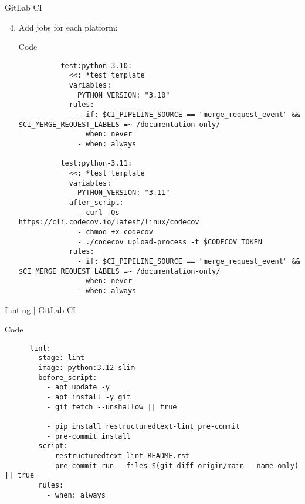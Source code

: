 \begin{frame}[fragile]{
    GitLab CI
    \hfill
  }
  \begin{enumerate}
    \setcounter{enumi}{3}
    \item Add jobs for each platform:
      \begin{block}{Code}
        \footnotesize
        \begin{verbatim}
          test:python-3.10:
            <<: *test_template
            variables:
              PYTHON_VERSION: "3.10"
            rules:
              - if: $CI_PIPELINE_SOURCE == "merge_request_event" && $CI_MERGE_REQUEST_LABELS =~ /documentation-only/
                when: never
              - when: always

          test:python-3.11:
            <<: *test_template
            variables:
              PYTHON_VERSION: "3.11"
            after_script:
              - curl -Os https://cli.codecov.io/latest/linux/codecov
              - chmod +x codecov
              - ./codecov upload-process -t $CODECOV_TOKEN
            rules:
              - if: $CI_PIPELINE_SOURCE == "merge_request_event" && $CI_MERGE_REQUEST_LABELS =~ /documentation-only/
                when: never
              - when: always
        \end{verbatim}
      \end{block}
  \end{enumerate}
\end{frame}


\begin{frame}[fragile]{Linting | GitLab CI}
  \begin{block}{Code}
    \footnotesize
    \begin{verbatim}
      lint:
        stage: lint
        image: python:3.12-slim
        before_script:
          - apt update -y
          - apt install -y git
          - git fetch --unshallow || true

          - pip install restructuredtext-lint pre-commit
          - pre-commit install
        script:
          - restructuredtext-lint README.rst
          - pre-commit run --files $(git diff origin/main --name-only) || true
        rules:
          - when: always
      \end{verbatim}
   \end{block}
\end{frame}


